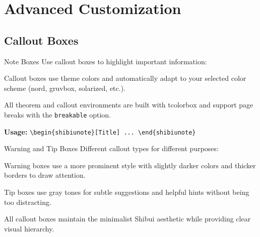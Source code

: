 \documentclass[aspectratio=169]{beamer}
\begin{document}
\section{Advanced Customization}

\subsection{Callout Boxes}

\begin{frame}{Note Boxes}
  Use callout boxes to highlight important information:

  \vspace{0.5em}

  \begin{shibiunote}[Important]
    Callout boxes use theme colors and automatically adapt to your selected color scheme (nord, gruvbox, solarized, etc.).
  \end{shibiunote}

  \vspace{0.5em}

  \begin{shibiunote}[Remember]
    All theorem and callout environments are built with tcolorbox and support page breaks with the \texttt{breakable} option.
  \end{shibiunote}

  \vspace{0.5em}

  \textbf{Usage:} \texttt{\textbackslash begin\{shibiunote\}[Title] ... \textbackslash end\{shibiunote\}}
\end{frame}

\begin{frame}{Warning and Tip Boxes}
  Different callout types for different purposes:

  \vspace{0.5em}

  \begin{shibuiwarning}[Caution]
    Warning boxes use a more prominent style with slightly darker colors and thicker borders to draw attention.
  \end{shibuiwarning}

  \vspace{0.5em}

  \begin{shibuitip}
    Tip boxes use gray tones for subtle suggestions and helpful hints without being too distracting.
  \end{shibuitip}

  \vspace{0.5em}

  All callout boxes maintain the minimalist Shibui aesthetic while providing clear visual hierarchy.
\end{frame}
\end{document}
